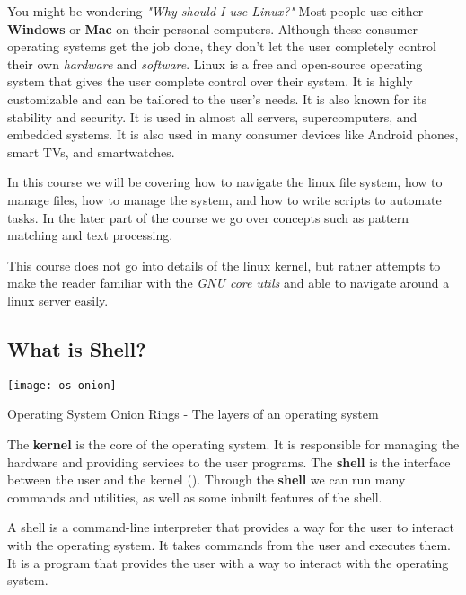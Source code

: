 You might be wondering
\textit{
  "Why should I use Linux?"
}
Most people use either \textbf{Windows} or \textbf{Mac} on their personal computers. Although these consumer operating systems get the job done, they don't let the user completely control their own \textit{hardware} and \textit{software}.
Linux
is a free and open-source operating system that gives the user complete control over their system. It is highly customizable and can be tailored to the user's needs. It is also known for its stability and security. It is used in almost all servers, supercomputers, and embedded systems. It is also used in many consumer devices like Android phones, smart TVs, and smartwatches.

In this course we will be covering how to navigate the linux file system, how to manage files, how to manage the system, and how to write scripts to automate tasks. In the later part of the course we go over concepts such as pattern matching and text processing.

This course does not go into details of the linux kernel, but rather attempts to make the reader familiar with the \textit{GNU core utils} and able to navigate around a linux server easily.

\subsection{What is Shell?}

\begin{marginfigure}
	\texttt{[image: os-onion]}
	\caption[Operating System Onion Rings]{
	  Operating System Onion Rings - The layers of an operating system
  }
\end{marginfigure}

The \textbf{kernel} is the core of the operating system. It is responsible for managing the hardware and providing services to the user programs. The \textbf{shell} is the interface between the user and the kernel (). Through the \textbf{shell} we can run many commands and utilities, as well as some inbuilt features of the shell.

\begin{definition}[Shell]
  A shell is a command-line interpreter that provides a way for the user to interact with the operating system. It takes commands from the user and executes them. It is a program that provides the user with a way to interact with the operating system.
\end{definition}

